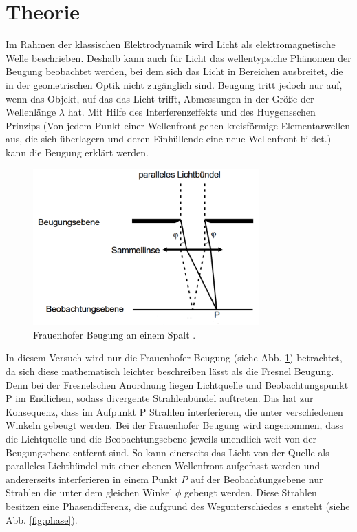 \section{Theorie}
\label{sec:Theorie}

Im Rahmen der klassischen Elektrodynamik wird Licht als elektromagnetische Welle beschrieben.
Deshalb kann auch für Licht das wellentypsiche Phänomen der Beugung beobachtet werden,
bei dem sich das Licht in Bereichen ausbreitet, die in der geometrischen Optik nicht zugänglich sind.
Beugung tritt jedoch nur auf, wenn das Objekt, auf das das Licht trifft, Abmessungen in der Größe der Wellenlänge $\lambda$ hat.
Mit Hilfe des Interferenzeffekts und des Huygensschen Prinzips
(Von jedem Punkt einer Wellenfront gehen kreisförmige Elementarwellen aus, die sich überlagern und deren Einhüllende eine neue Wellenfront bildet.)
kann die Beugung erklärt werden.
\begin{figure}
  \centering
  \includegraphics[height=6cm]{data/frau.png}
  \caption{Frauenhofer Beugung an einem Spalt \cite{sample}.}
  \label{fig:frau}
\end{figure}
In diesem Versuch wird nur die Frauenhofer Beugung (siehe Abb. \ref{fig:frau}) betrachtet, da sich diese mathematisch leichter beschreiben lässt als die Fresnel Beugung.
Denn bei der Fresnelschen Anordnung liegen Lichtquelle und Beobachtungspunkt P im Endlichen, 
sodass divergente Strahlenbündel auftreten. 
Das hat zur Konsequenz, dass im Aufpunkt P Strahlen interferieren, 
die unter verschiedenen Winkeln gebeugt werden.
Bei der Frauenhofer Beugung wird angenommen, dass die Lichtquelle und die Beobachtungsebene jeweils unendlich weit von der Beugungsebene entfernt sind.
So kann einerseits das Licht von der Quelle als paralleles Lichtbündel mit einer ebenen Wellenfront aufgefasst werden und
andererseits interferieren in einem Punkt $P$ auf der Beobachtungsebene nur Strahlen die unter dem gleichen Winkel $\phi$ gebeugt werden.
Diese Strahlen besitzen eine Phasendifferenz, die aufgrund des Wegunterschiedes $s$ ensteht (siehe Abb. \ref{fig:phase}).
